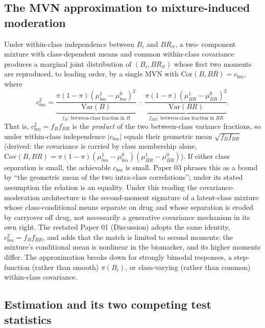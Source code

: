 \documentclass[11pt]{article}
\begin{document}
\subsection{The MVN approximation to mixture-induced moderation}

Under within-class independence between $B_i$ and $BR_{it}$, a two-
component mixture with class-dependent means and common within-class
covariance produces a marginal joint distribution of $(B_i, BR_{it})$
whose first two moments are reproduced, to leading order, by a single
MVN with $\mathrm{Cor}(B, BR) = c_{bm}$, where
\begin{equation}
c_{bm}^2 = \underbrace{\frac{\pi(1-\pi)(\mu_{bm}^1 - \mu_{bm}^0)^2}
  {\mathrm{Var}(B)}}_{f_B:\ \text{between-class fraction in } B} \; \cdot \;
  \underbrace{\frac{\pi(1-\pi)(\mu_{BR}^1 - \mu_{BR}^0)^2}
  {\mathrm{Var}(BR)}}_{f_{BR}:\ \text{between-class fraction in } BR}.
\label{eq:latent-mvn-approx}
\end{equation}
That is, $c_{bm}^2 = f_B f_{BR}$ is the \emph{product} of the two
between-class variance fractions, so under within-class independence
$|c_{bm}|$ equals their geometric mean $\sqrt{f_B f_{BR}}$ (derived:
the covariance is carried by class membership alone,
$\mathrm{Cov}(B, BR) = \pi(1-\pi)(\mu_{bm}^1-\mu_{bm}^0)(\mu_{BR}^1-\mu_{BR}^0)$).
If either class separation is small, the achievable $c_{bm}$ is small.
Paper 03 phrases this as a bound by ``the geometric mean of the two
intra-class correlations''; under its stated assumption the relation
is an equality. Under this reading the covariance-moderation
architecture is the second-moment signature of a latent-class mixture
whose class-conditional means separate on drug and whose separation is
eroded by carryover off drug, not necessarily a generative covariance
mechanism in its own right. The restated Paper 01 (Discussion) adopts
the same identity, $c_{bm}^2 = f_B f_{BR}$, and adds that the match is
limited to second moments: the mixture's conditional mean is nonlinear
in the biomarker, and its higher moments differ. The approximation
breaks down for strongly bimodal responses, a step-function (rather
than smooth) $\pi(B_i)$, or class-varying (rather than common)
within-class covariance.

\subsection{Estimation and its two competing test statistics}
\end{document}

